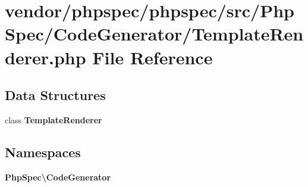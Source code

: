\section{vendor/phpspec/phpspec/src/\+Php\+Spec/\+Code\+Generator/\+Template\+Renderer.php File Reference}
\label{_template_renderer_8php}
\subsection*{Data Structures}
\begin{DoxyCompactItemize}
\item 
class {\bf Template\+Renderer}
\end{DoxyCompactItemize}
\subsection*{Namespaces}
\begin{DoxyCompactItemize}
\item 
 {\bf Php\+Spec\textbackslash{}\+Code\+Generator}
\end{DoxyCompactItemize}
